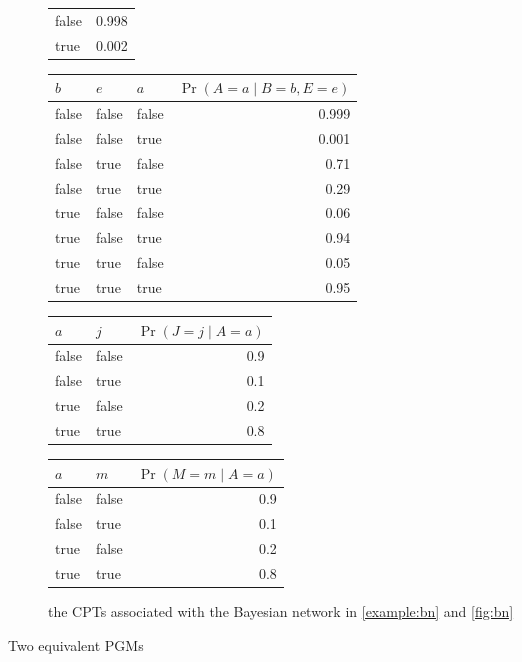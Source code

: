 \begin{figure}[t]
\begin{subfigure}{\textwidth}
\begin{minipage}{0.57\textwidth}
\begin{tabular}[t]{lr}
        false & 0.998 \\
        true & 0.002 \\
        \bottomrule
      \end{tabular}
      \newline
      \newline
      \begin{tabular}[t]{lllr}
        \toprule
        $b$ & $e$ & $a$ & $\Pr(A = a \mid B = b, E = e)$ \\
        \midrule
        false & false & false & 0.999 \\
        false & false & true & 0.001 \\
        false & true & false & 0.71 \\
        false & true & true & 0.29 \\
        true & false & false & 0.06 \\
        true & false & true & 0.94 \\
        true & true & false & 0.05 \\
        true & true & true & 0.95 \\
        \bottomrule
      \end{tabular}
    \end{minipage}%
    \begin{minipage}{0.43\textwidth}
      \centering
      \begin{tabular}[t]{llr}
        \toprule
        $a$ & $j$ & $\Pr(J = j \mid A = a)$ \\
        \midrule
        false & false & 0.9 \\
        false & true & 0.1 \\
        true & false & 0.2 \\
        true & true & 0.8 \\
        \bottomrule
      \end{tabular}
      \newline
      \newline
      \begin{tabular}[t]{llr}
        \toprule
        $a$ & $m$ & $\Pr(M = m \mid A = a)$ \\
        \midrule
        false & false & 0.9 \\
        false & true & 0.1 \\
        true & false & 0.2 \\
        true & true & 0.8 \\
        \bottomrule
      \end{tabular}
    \end{minipage}
    \caption{the CPTs associated with the Bayesian network in \cref{example:bn} and \cref{fig:bn}}
    \label{fig:examplecpts}
  \end{subfigure}
  \caption{Two equivalent PGMs}
\end{figure}

